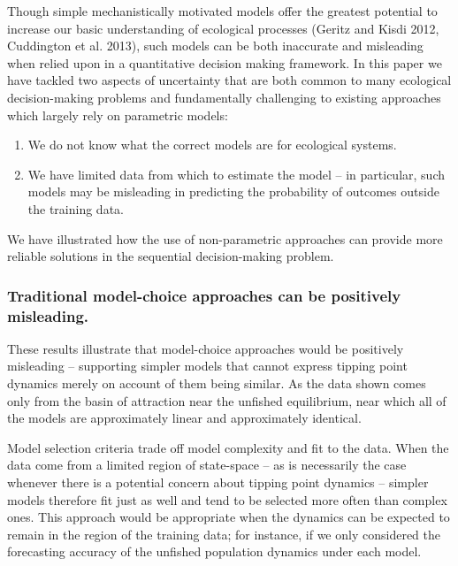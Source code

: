 \documentclass[author-year, 12pt,review]{components/elsarticle} %
\begin{document}
Though simple mechanistically motivated models offer the greatest
potential to increase our basic understanding of ecological processes
(Geritz and Kisdi 2012, Cuddington et al. 2013), such models can be both
inaccurate and misleading when relied upon in a quantitative decision
making framework. In this paper we have tackled two aspects of
uncertainty that are both common to many ecological decision-making
problems and fundamentally challenging to existing approaches which
largely rely on parametric models:

\begin{enumerate}
\def\labelenumi{\arabic{enumi}.}
\itemsep1pt\parskip0pt
\item
  We do not know what the correct models are for ecological systems.
\item
  We have limited data from which to estimate the model -- in
  particular, such models may be misleading in predicting the
  probability of outcomes outside the training data.
\end{enumerate}

We have illustrated how the use of non-parametric approaches can provide
more reliable solutions in the sequential decision-making problem.

\subsubsection{Traditional model-choice approaches can be positively
misleading.}\label{traditional-model-choice-approaches-can-be-positively-misleading.}

These results illustrate that model-choice approaches would be
positively misleading -- supporting simpler models that cannot express
tipping point dynamics merely on account of them being similar. As the
data shown comes only from the basin of attraction near the unfished
equilibrium, near which all of the models are approximately linear and
approximately identical.

Model selection criteria trade off model complexity and fit to the data.
When the data come from a limited region of state-space -- as is
necessarily the case whenever there is a potential concern about tipping
point dynamics -- simpler models therefore fit just as well and tend to
be selected more often than complex ones. This approach would be
appropriate when the dynamics can be expected to remain in the region of
the training data; for instance, if we only considered the forecasting
accuracy of the unfished population dynamics under each model.
\end{document}
